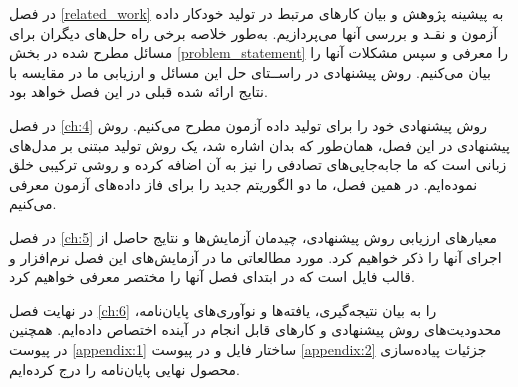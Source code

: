 در فصل \ref{related_work} به پیشینه پژوهش و بیان کارهای مرتبط در تولید خودکار داده آزمون و نقـد و بررسی آنها می‌پردازیم. به‌طور خلاصه برخی راه حل‌های دیگران برای مسائل مطرح شده در بخش \ref{problem_statement} را معرفی و  سپس مشکلات آنها را بیان می‌کنیم. روش پیشنهادی در راســتای حل این مسائل و ارزیابی ما در مقایسه با نتایج ارائه شده قبلی در این فصل خواهد بود.

در فصل \ref{ch:4} روش پیشنهادی خود را برای تولید داده آزمون مطرح می‌کنیم. روش پیشنهادی در این فصل، همان‌طور که بدان اشاره شد، یک روش تولید مبتنی بر مدل‌های زبانی است که ما جابه‌جایی‌های تصادفی را نیز به آن اضافه کرده‌ و روشی ترکیبی خلق نموده‌ایم. در  همین فصل، ما دو الگوریتم جدید را برای فاز داده‌های آزمون معرفی می‌کنیم.

در فصل \ref{ch:5} معیارهای ارزیابی روش پیشنهادی، چیدمان آزمایش‌ها و نتایج حاصل از اجرای آنها را ذکر خواهیم کرد. مورد مطالعاتی ما در آزمایش‌های این فصل نرم‌افزار 
 \cite{MuPDF2018}
 و قالب فایل  است که در ابتدای فصل آنها را مختصر معرفی خواهیم کرد. 

در نهایت فصل \ref{ch:6} را به بیان نتیجه‌گیری، یافته‌ها و نوآوری‌های پایان‌نامه، محدودیت‌های روش پیشنهادی و کارهای قابل انجام در آینده اختصاص داده‌ایم. همچنین در پیوست \ref{appendix:1} ساختار فایل  و در پیوست \ref{appendix:2} جزئیات پیاده‌سازی محصول نهایی پایان‌نامه را درج کرده‌ایم.



